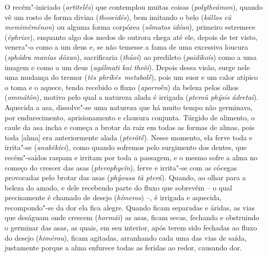 \bekker{[251a]} O recém"-iniciado (\emph{artitelḗs}) que contemplou muitas
coisas (\emph{polytheámon}), quando vê um rosto de forma divina
(\emph{theoeidés}), bem imitando o belo (\emph{kállos eû memimêménon})
ou alguma forma corpórea (\emph{sṓmatos idéan}), primeiro estremece
(\emph{éphrixe}), enquanto algo dos medos de outrora chega até ele,
depois de ter visto, venera"-o como a um deus e, se não temesse a fama de
uma excessiva loucura (\emph{sphódra manías dóxan}), sacrificaria
(\emph{thúoi}) ao predileto (\emph{paidikoîs}) como a uma imagem e como
a um deus (\emph{agálmati kai theôi}). Depois dessa visão, surge nele
uma mudança do tremor (\emph{tês phríkês}~\emph{metabolḗ}), pois um suor
e um calor atípico o toma e o aquece, tendo recebido \bekker{[251b]} o fluxo
(\emph{aporroḕn}) da beleza pelos olhos (\emph{ommátôn}), motivo pelo
qual a natureza alada é irrigada (\emph{pteroû phýsis ádretai}).
Aquecida a asa, dissolve"-se uma natureza que há muito tempo não
germinava, por endurecimento, aprisionamento e clausura conjunta.
Túrgido de alimento, o caule da asa incha e começa a brotar da raiz em
todas as formas de almas, pois toda [alma] era anteriormente alada
(\emph{pterôtḗ}). Nesse momento, ela ferve toda e irrita"-se
(\emph{anakêkíei}), \bekker{[251c]} como quando sofremos pelo surgimento dos
dentes, que recém"-saídos raspam e irritam por toda a passagem, e o mesmo
sofre a alma no começo do crescer das asas (\emph{pterophyeîn}), ferve e
irrita"-se com as cócegas provocadas pelo brotar das asas (\emph{phýousa
tà pterá}). Quando, ao olhar para a beleza do amado, e dele recebendo
parte do fluxo que sobrevém -- o qual precisamente é chamado de desejo
(\emph{hímeros}) --, é irrigada e
aquecida, recompondo"-se da dor ela fica alegre. \bekker{[251d]} Quando ficam
separadas e áridas, as vias que deságuam onde crescem (\emph{hormâi}) as
asas, ficam secas, fechando e obstruindo o germinar das asas, as quais,
em seu interior, após terem sido fechadas ao fluxo do desejo
(\emph{himérou}), ficam agitadas, arranhando cada uma das vias de saída,
justamente porque a alma enfurece todas as feridas ao redor, causando
dor.

